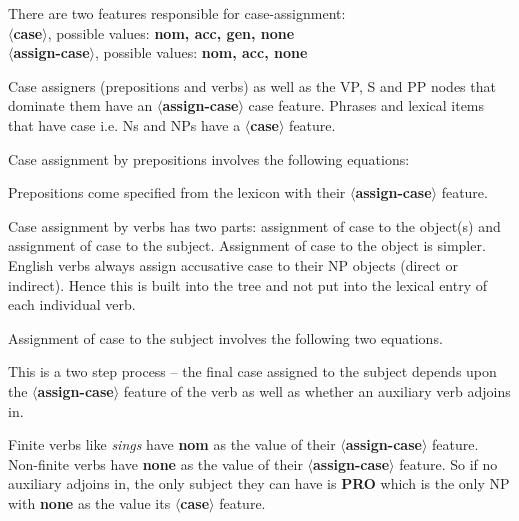 There are two features responsible for case-assignment:\\
{\bf $\langle$case$\rangle$}, possible values: {\bf nom, acc, gen, none}\\
{\bf $\langle$assign-case$\rangle$}, possible values: {\bf nom, acc, none}

Case assigners (prepositions and verbs) as well as the VP, S and PP
nodes that dominate them have an {\bf $\langle$assign-case$\rangle$}
case feature. Phrases and lexical items that have case i.e. Ns and NPs
have a {\bf $\langle$case$\rangle$} feature.

Case assignment by prepositions involves the following equations:




Prepositions come specified from the lexicon with their {\bf $\langle$assign-case$\rangle$}
feature.



Case assignment by verbs has two parts: assignment of case to the
object(s) and assignment of case to the subject. Assignment of case to
the object is simpler.  English verbs always assign accusative case to
their NP objects (direct or indirect).  Hence this is built into the
tree and not put into the lexical entry of each individual verb.


Assignment of case to the subject involves the following two equations.




This is a two step process -- the final case assigned to the subject
depends upon the {\bf $\langle$assign-case$\rangle$} feature of the
verb as well as whether an auxiliary verb adjoins in.

Finite verbs like {\em sings} have {\bf nom} as the value of their
{\bf $\langle$assign-case$\rangle$} feature. Non-finite verbs have
{\bf none} as the value of their {\bf $\langle$assign-case$\rangle$}
feature. So if no auxiliary adjoins in, the only subject they can have
is {\bf PRO} which is the only NP with {\bf none} as the value its
{\bf $\langle$case$\rangle$} feature.

